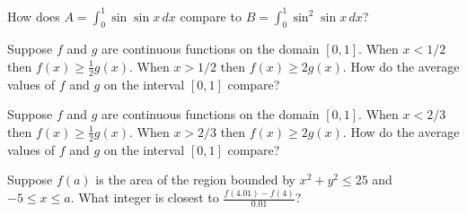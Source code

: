 \documentclass{ximera}
\newcommand{\recommendation}[1]{}
\begin{document}
\begin{problem}
  How does $A = \int_0^1 \sin \sin x \, dx$ compare to $B = \int_0^1 \sin^2 \sin x \, dx$?
  \begin{multipleChoice}
  \end{multipleChoice}
\end{problem}

\begin{problem}
\recommendation{Vic}
  Suppose $f$ and $g$ are continuous functions on the domain $[0,1]$.  When $x < 1/2$ then $f(x) \geq \frac{1}{2} g(x)$.  When $x > 1/2$ then $f(x) \geq 2 g(x)$.  How do the average values of $f$ and $g$ on the interval $[0,1]$ compare?
  \begin{multipleChoice}
  \end{multipleChoice}
\end{problem}

\begin{problem}
  Suppose $f$ and $g$ are continuous functions on the domain $[0,1]$.  When $x < 2/3$ then $f(x) \geq \frac{1}{2} g(x)$.  When $x > 2/3$ then $f(x) \geq 2 g(x)$.  How do the average values of $f$ and $g$ on the interval $[0,1]$ compare?
  \begin{multipleChoice}
  \end{multipleChoice}
\end{problem}

\begin{problem}
  Suppose $f(a)$ is the area of the region bounded by $x^2 + y^2 \leq 25$ and $-5 \leq x \leq a$.  What integer is closest to $\frac{f(4.01) - f(4)}{0.01}$?
  \begin{multipleChoice}
  \end{multipleChoice}
\end{problem}
\end{document}
